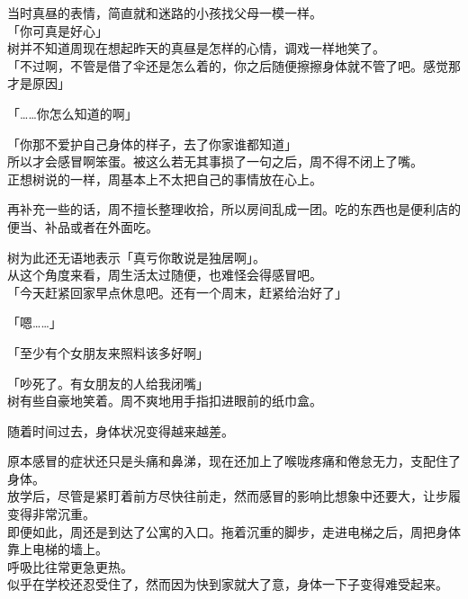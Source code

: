 当时真昼的表情，简直就和迷路的小孩找父母一模一样。\\

「你可真是好心」\\

树并不知道周现在想起昨天的真昼是怎样的心情，调戏一样地笑了。\\

「不过啊，不管是借了伞还是怎么着的，你之后随便擦擦身体就不管了吧。感觉那才是原因」

「……你怎么知道的啊」

「你那不爱护自己身体的样子，去了你家谁都知道」\\

所以才会感冒啊笨蛋。被这么若无其事损了一句之后，周不得不闭上了嘴。\\

正想树说的一样，周基本上不太把自己的事情放在心上。

再补充一些的话，周不擅长整理收拾，所以房间乱成一团。吃的东西也是便利店的便当、补品或者在外面吃。

树为此还无语地表示「真亏你敢说是独居啊」。\\

从这个角度来看，周生活太过随便，也难怪会得感冒吧。\\

「今天赶紧回家早点休息吧。还有一个周末，赶紧给治好了」

「嗯……」

「至少有个女朋友来照料该多好啊」

「吵死了。有女朋友的人给我闭嘴」\\

树有些自豪地笑着。周不爽地用手指扣进眼前的纸巾盒。\\

\vspace{2\baselineskip}

随着时间过去，身体状况变得越来越差。

原本感冒的症状还只是头痛和鼻涕，现在还加上了喉咙疼痛和倦怠无力，支配住了身体。\\

放学后，尽管是紧盯着前方尽快往前走，然而感冒的影响比想象中还要大，让步履变得非常沉重。\\

即便如此，周还是到达了公寓的入口。拖着沉重的脚步，走进电梯之后，周把身体靠上电梯的墙上。\\

呼吸比往常更急更热。\\

似乎在学校还忍受住了，然而因为快到家就大了意，身体一下子变得难受起来。

